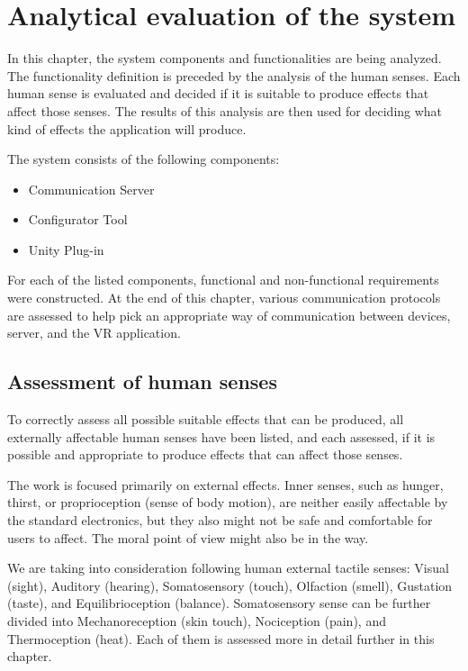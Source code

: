 \chapter{Analytical evaluation of the system}

In this chapter, the system components and functionalities are being analyzed.
The functionality definition is preceded by the analysis of the human senses.
Each human sense is evaluated and decided if it is suitable to produce effects
that affect those senses. The results of this analysis are then used for
deciding what kind of effects the application will produce.


The system consists of the following components:


\begin{itemize}

\item Communication Server

\item Configurator Tool

\item Unity Plug-in

\end{itemize}


For each of the listed components, functional and non-functional requirements
were constructed. At the end of this chapter, various communication protocols
are assessed to help pick an appropriate way of communication between devices,
server, and the VR application.


\hypertarget{x-assessment-of-human-senses}{\section{Assessment of human senses}}
To correctly assess all possible suitable effects that can be produced, all externally affectable human senses have been listed, and each assessed,
if it is possible and appropriate to produce effects that can affect those senses.


The work is focused primarily on external effects. Inner senses, such as
hunger, thirst, or proprioception (sense of body motion), are neither
easily affectable by the standard electronics, but they also might not be safe
and comfortable for users to affect. The moral point of view
might also be in the way.


We are taking into consideration following human external tactile senses:
Visual (sight), Auditory (hearing), Somatosensory (touch), Olfaction (smell),
Gustation (taste), and Equilibrioception (balance). Somatosensory sense can
be further divided into Mechanoreception (skin touch), Nociception (pain), and
Thermoception (heat). Each of them is assessed more in detail further in this
chapter.


